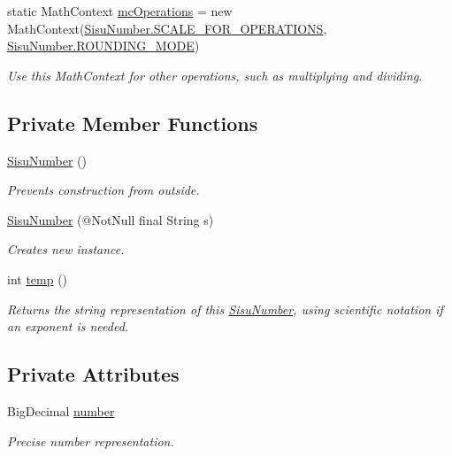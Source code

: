 \begin{DoxyCompactItemize}
static Math\+Context \hyperlink{classcom_1_1aarrelaakso_1_1drawl_1_1_sisu_number_a526b69c7921d715b6b49ad98ecf442fc}{mc\+Operations} = new Math\+Context(\hyperlink{classcom_1_1aarrelaakso_1_1drawl_1_1_sisu_number_a0ab71e0c4e4143159d9341c562d131af}{Sisu\+Number.\+S\+C\+A\+L\+E\+\_\+\+F\+O\+R\+\_\+\+O\+P\+E\+R\+A\+T\+I\+O\+NS}, \hyperlink{classcom_1_1aarrelaakso_1_1drawl_1_1_sisu_number_a98077c422e928740febf571e3f2ec6b5}{Sisu\+Number.\+R\+O\+U\+N\+D\+I\+N\+G\+\_\+\+M\+O\+DE})
\begin{DoxyCompactList}\small\item\em Use this Math\+Context for other operations, such as multiplying and dividing. \end{DoxyCompactList}\end{DoxyCompactItemize}
\subsection*{Private Member Functions}
\begin{DoxyCompactItemize}
\item 
\hyperlink{classcom_1_1aarrelaakso_1_1drawl_1_1_sisu_number_a3e7b40170c4ae69461b94208a0f82f5e}{Sisu\+Number} ()
\begin{DoxyCompactList}\small\item\em Prevents construction from outside. \end{DoxyCompactList}\item 
\hyperlink{classcom_1_1aarrelaakso_1_1drawl_1_1_sisu_number_acd07ad566abfb66de69b21bb1b31c189}{Sisu\+Number} (@Not\+Null final String s)
\begin{DoxyCompactList}\small\item\em Creates new instance. \end{DoxyCompactList}\item 
int \hyperlink{classcom_1_1aarrelaakso_1_1drawl_1_1_sisu_number_a846e0834c619e63a8d85579484ab4276}{temp} ()
\begin{DoxyCompactList}\small\item\em Returns the string representation of this \hyperlink{classcom_1_1aarrelaakso_1_1drawl_1_1_sisu_number}{Sisu\+Number}, using scientific notation if an exponent is needed. \end{DoxyCompactList}\end{DoxyCompactItemize}
\subsection*{Private Attributes}
\begin{DoxyCompactItemize}
\item 
Big\+Decimal \hyperlink{classcom_1_1aarrelaakso_1_1drawl_1_1_sisu_number_a5741c4131458787e3adb0bfe649d7758}{number}
\begin{DoxyCompactList}\small\item\em Precise number representation. \end{DoxyCompactList}\end{DoxyCompactItemize}
